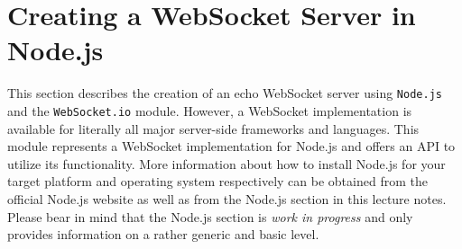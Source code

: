 \documentclass[a4paper, justified, notoc]{tufte-handout} %
\begin{document}
%
%
%
%
%


\section{Creating a WebSocket Server in Node.js} %
\label{sec:creating_a_websocket_server}

This section describes the creation of an echo WebSocket server using \texttt{Node.js} and the \texttt{WebSocket.io} module. However, a WebSocket implementation is available for literally all major server-side frameworks and languages. This module represents a WebSocket implementation for Node.js and offers an API to utilize its functionality. More information about how to install Node.js for your target platform and operating system respectively can be obtained from the official Node.js website as well as from the Node.js section in this lecture notes. Please bear in mind that the Node.js section is \emph{work in progress} and only provides information on a rather generic and basic level.
\end{document}
